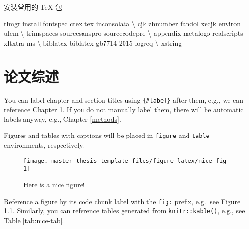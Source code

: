 \documentclass[]{ctexbook}
\newenvironment{Shaded}{\begin{snugshade}}{\end{snugshade}}
\newcommand{\ExtensionTok}[1]{#1}
\newcommand{\NormalTok}[1]{#1}
\theoremstyle{definition}
\theoremstyle{definition}
\theoremstyle{definition}
\theoremstyle{remark}
\begin{document}
安装常用的 TeX 包

\begin{Shaded}
\begin{Highlighting}[]
\ExtensionTok{tlmgr}\NormalTok{ install fontspec ctex tex inconsolata \textbackslash{}}
\NormalTok{      cjk zhnumber fandol xecjk environ ulem \textbackslash{}}
\NormalTok{      trimspaces sourcesanspro sourcecodepro \textbackslash{}}
\NormalTok{      appendix metalogo realscripts xltxtra ms \textbackslash{}}
\NormalTok{      biblatex biblatex-gb7714-2015 logreq \textbackslash{}}
\NormalTok{      xstring}
\end{Highlighting}
\end{Shaded}

\chapter{论文综述}\label{intro}

You can label chapter and section titles using \texttt{\{\#label\}}
after them, e.g., we can reference Chapter \ref{intro}. If you do not
manually label them, there will be automatic labels anyway, e.g.,
Chapter \ref{methods}.

Figures and tables with captions will be placed in \texttt{figure} and
\texttt{table} environments, respectively.

\begin{figure}

{\centering \texttt{[image: master-thesis-template\_files/figure-latex/nice-fig-1]} 

}

\caption{Here is a nice figure!}\label{fig:nice-fig}
\end{figure}

Reference a figure by its code chunk label with the \texttt{fig:}
prefix, e.g., see Figure \ref{fig:nice-fig}. Similarly, you can
reference tables generated from \texttt{knitr::kable()}, e.g., see Table
\ref{tab:nice-tab}.
\end{document}
